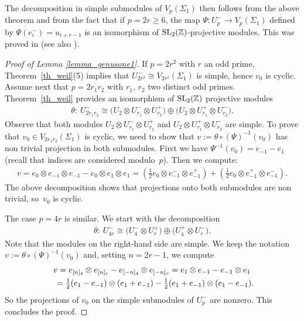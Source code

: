 \documentclass[pdftex]{sigma}
\numberwithin{equation}{section}
\begin{document}
The decomposition in simple submodules of $V_p(\Sigma_1)$ then follows from the above theorem and from the fact that if $p=2r\geq 6$, the map $\Psi\colon U_p^- \rightarrow V_{p}(\Sigma_1)$
defined by $\Psi(e_i^-) = u_{i+r-1}$ is an isomorphism of $\operatorname{SL}_2(\mathbb{Z})$-projective modules. This was proved in \cite{FK} (see also \cite[Theorem~5.1]{Koju1}).

\begin{proof}[Proof of Lemma \ref{lemma_genusone1}]If $p=2r^2$ with $r$ an odd prime, Theorem~\ref{th_weil}(5) implies that $U_{2 r^2}^- \cong V_{2r^2}(\Sigma_1)$ is simple, hence $v_0$ is cyclic. Assume next that $p=2r_1r_2$ with $r_1$, $r_2$ two distinct odd primes. Theorem~\ref{th_weil} provides an isomorphism of $\operatorname{SL}_2(\mathbb{Z})$ projective modules
\begin{gather*} \theta \colon \ U_{2r_1r_2}^- \cong \big(U_2\otimes U_{r_1}^-\otimes U_{r_2}^+\big) \oplus \big(U_2\otimes U_{r_1}^+ \otimes U_{r_2}^-\big).\end{gather*}
Observe that both modules $U_2\otimes U_{r_1}^-\otimes U_{r_2}^+$ and $U_2\otimes U_{r_1}^+ \otimes U_{r_2}^-$ are simple. To prove that $v_0 \in V_{2r_1r_2}(\Sigma_1)$ is cyclic, we need to show that $v:= \theta\circ (\Psi)^{-1} (v_0) $ has non trivial projection in both submodules. First we have $\Psi^{-1}(v_0) = e_{-1} - e_1$ (recall that indices are considered modulo~$p$). Then we compute:
\begin{gather*} v = e_0\otimes e_{-1} \otimes e_{-1} - e_0\otimes e_1\otimes e_1 = \left( \tfrac{1}{2} e_0 \otimes e_{-1}^- \otimes e_{-1}^+ \right) + \left(\tfrac{1}{2} e_0\otimes e_{-1}^+\otimes e_{-1}^- \right).\end{gather*}
The above decomposition shows that projections onto both submodules are non trivial, so~$v_0$ is cyclic.

The case $p=4r$ is similar. We start with the decomposition
\begin{gather*} \theta \colon \ U_{4r}^- \cong \big(U_4^- \otimes U_r^+\big) \oplus \big(U_4^+ \otimes U_r^-\big).\end{gather*}
Note that the modules on the right-hand side are simple. We keep the notation $v:=\theta\circ (\Psi)^{-1}(v_0)$ and, setting $n=2r-1$, we compute
\begin{gather*} v= e_{[n]_4}\otimes e_{[n]_r} - e_{[-n]_4}\otimes e_{[-n]_r} = e_1\otimes e_{-1} - e_{-1}\otimes e_1 \\
\hphantom{v}{} = \tfrac{1}{2}(e_1-e_{-1})\otimes (e_1+e_{-1}) - \tfrac{1}{2}(e_1+e_{-1})\otimes (e_1-e_{-1}).
\end{gather*}
So the projections of $v_0$ on the simple submodules of $U_p^-$ are nonzero. This concludes the proof.
\end{proof}
\end{document}
